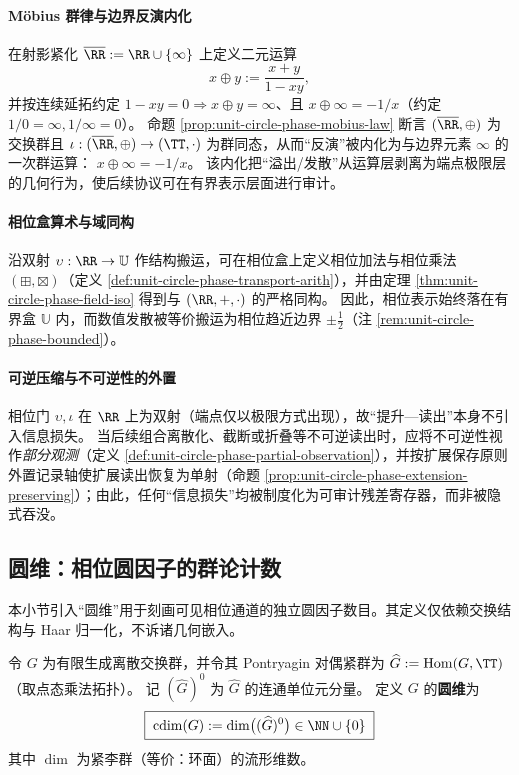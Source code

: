 \paragraph{Möbius 群律与边界反演内化}
在射影紧化 \(\overline{\RR}:=\RR\cup\{\infty\}\) 上定义二元运算
\[
x\oplus y:=\frac{x+y}{1-xy},
\]
并按连续延拓约定 \(1-xy=0\Rightarrow x\oplus y=\infty\)、且 \(x\oplus\infty=-1/x\)（约定 \(1/0=\infty,1/\infty=0\)）。
命题 \ref{prop:unit-circle-phase-mobius-law} 断言 \((\overline{\RR},\oplus)\) 为交换群且 \(\iota:(\overline{\RR},\oplus)\to(\TT,\cdot)\) 为群同态，从而“反演”被内化为与边界元素 \(\infty\) 的一次群运算：
\(
x\oplus\infty=-1/x
\)。
该内化把“溢出/发散”从运算层剥离为端点极限层的几何行为，使后续协议可在有界表示层面进行审计。

\paragraph{相位盒算术与域同构}
沿双射 \(\upsilon:\RR\to\mathbb{U}\) 作结构搬运，可在相位盒上定义相位加法与相位乘法 \((\boxplus,\boxtimes)\)（定义 \ref{def:unit-circle-phase-transport-arith}），并由定理 \ref{thm:unit-circle-phase-field-iso} 得到与 \((\RR,+,\cdot)\) 的严格同构。
因此，相位表示始终落在有界盒 \(\mathbb{U}\) 内，而数值发散被等价搬运为相位趋近边界 \(\pm\tfrac12\)（注 \ref{rem:unit-circle-phase-bounded}）。

\paragraph{可逆压缩与不可逆性的外置}
相位门 \(\upsilon,\iota\) 在 \(\RR\) 上为双射（端点仅以极限方式出现），故“提升—读出”本身不引入信息损失。
当后续组合离散化、截断或折叠等不可逆读出时，应将不可逆性视作\emph{部分观测}（定义 \ref{def:unit-circle-phase-partial-observation}），并按扩展保存原则外置记录轴使扩展读出恢复为单射（命题 \ref{prop:unit-circle-phase-extension-preserving}）；由此，任何“信息损失”均被制度化为可审计残差寄存器，而非被隐式吞没。

\subsection{圆维：相位圆因子的群论计数}\label{subsec:cdim-circle-dimension}
本小节引入“圆维”用于刻画可见相位通道的独立圆因子数目。其定义仅依赖交换结构与 Haar 归一化，不诉诸几何嵌入。

\begin{definition}[圆维]\label{def:circle-dimension}
令 \(G\) 为有限生成离散交换群，并令其 Pontryagin 对偶紧群为 \(\widehat{G}:=\operatorname{Hom}(G,\TT)\)（取点态乘法拓扑）。
记 \((\widehat G)^0\) 为 \(\widehat G\) 的连通单位元分量。
定义 \(G\) 的\textbf{圆维}为
\[
\boxed{\;\cdim(G):=\dim\bigl((\widehat G)^0\bigr)\in\NN\cup\{0\}\;}
\]
其中 \(\dim\) 为紧李群（等价：环面）的流形维数。
\end{definition}

